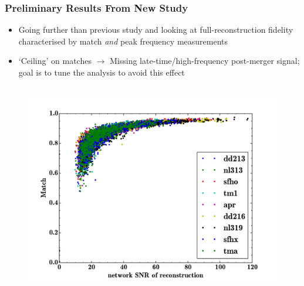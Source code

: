 \documentclass[serif,mathserif,10pt]{beamer}
\let\oldframetitle\frametitle%
\renewcommand{\frametitle}[1]{%
      \oldframetitle{#1}\setstretch{1.2}}
\begin{document}
\begin{frame}
    \frametitle{Preliminary Results From New Study}
    \begin{itemize}
        \item Going further than previous study and looking at
            full-reconstruction fidelity characterised by match \emph{and}
            peak frequency measurements
        \item `Ceiling' on matches $\rightarrow$ Missing
            late-time/high-frequency post-merger signal; goal is to tune the
            analysis to avoid this effect
    \end{itemize}


    \begin{columns}


        \begin{center}
            \vspace{-0.1cm}
            \begin{figure}
                \includegraphics[width=1.0\columnwidth]{figures/recSNR_vs_match.pdf}
            \end{figure}
        \end{center}



\end{columns}
\end{frame}
\end{document}
